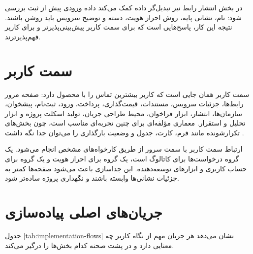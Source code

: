 در بخش انتشار رابط نیز تبدیل‌گر داده کمک می‌کند داده ورودی پیش از ثبت بررسی شود: نام، نشانی پایه، روش احراز هویت، دسته و توضیح سرویس باید روشن باشند. نتیجه این کار، پاسخ‌هایی است که برای سمت کاربر پیش‌بینی‌پذیرتر و برای کاربر فهم‌پذیرترند.

\section{سمت کاربر}
سمت کاربر همان جایی است که کاربر بیشترین تماس را با محصول دارد: صفحه مرور رابط‌ها، جزئیات سرویس، مستندات، قیمت‌گذاری، پرداخت، ورود، ثبت‌نام، پیشخوان، سازمان‌ها، انتشار، ابزار فراخوان، محیط طراحی جریان، تولید اسکلت پروژه و ابزار تحلیل و استقرار. معماری مؤلفه‌ای  برای چنین تجربه‌ای مناسب است، چون بخش‌های تکرارشونده مانند فرم، کارت، جدول و وضعیت بارگذاری را می‌توان جدا نگه داشت \cite{react}.

ارتباط سمت کاربر با سمت سرور از طریق کارخواه‌های مشخص انجام می‌شود. یک گروه درخواست‌ها برای کاتالوگ است، یک گروه برای احراز هویت و یک گروه برای حساب کاربری و ابزارهای توسعه‌دهنده. این جداسازی باعث می‌شود صفحه‌ها کمتر به جزئیات نشانی‌ها وابسته باشند و نگهداری پروژه ساده‌تر شود.

\section{جریان‌های اصلی پیاده‌سازی}
جدول \ref{tab:implementation-flows} نشان می‌دهد هر جریان مهم از نگاه کاربر چه معنایی دارد و در پشت صحنه کدام بخش‌ها را درگیر می‌کند.

